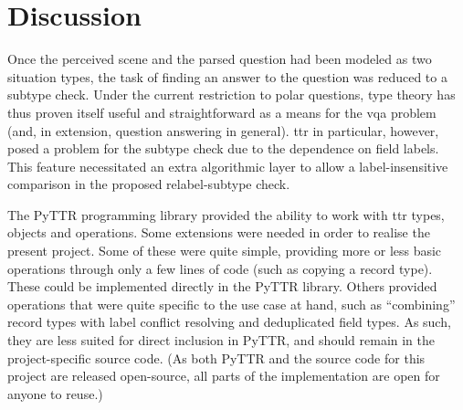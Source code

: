\section{Discussion}
\label{sec:discussion}


Once the perceived scene and the parsed question had been modeled as two situation types, the task of finding an answer to the question was reduced to a subtype check.
Under the current restriction to polar questions, type theory has thus proven itself useful and straightforward as a means for the \gls{vqa} problem (and, in extension, question answering in general).
\gls{ttr} in particular, however, posed a problem for the subtype check due to the dependence on field labels.
This feature necessitated an extra algorithmic layer to allow a label-insensitive comparison in the proposed relabel-subtype check.

The PyTTR programming library provided the ability to work with \gls{ttr} types, objects and operations.
Some extensions were needed in order to realise the present project.
Some of these were quite simple, providing more or less basic operations through only a few lines of code (such as copying a record type).
These could be implemented directly in the PyTTR library.
Others provided operations that were quite specific to the use case at hand, such as ``combining'' record types with label conflict resolving and deduplicated field types.
As such, they are less suited for direct inclusion in PyTTR, and should remain in the project-specific source code.
(As both PyTTR and the source code for this project are released open-source, all parts of the implementation are open for anyone to reuse.)

